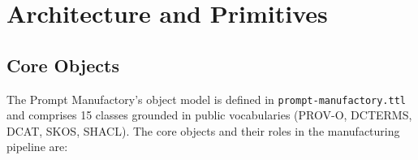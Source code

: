 
\section{Architecture and Primitives}
\label{sec:research-prompt-manufactory-architecture}

\subsection{Core Objects}
\label{sec:research-prompt-manufactory-architecture-objects}

The Prompt Manufactory's object model is defined in \texttt{prompt-manufactory.ttl} and
comprises 15 classes grounded in public vocabularies (PROV-O, DCTERMS, DCAT, SKOS, SHACL).
The core objects and their roles in the manufacturing pipeline are:

